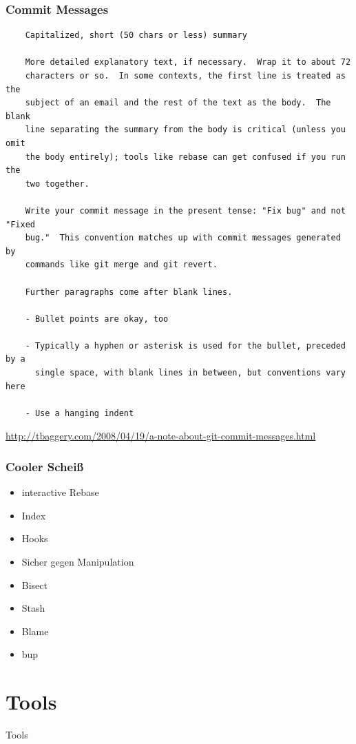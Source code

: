 \documentclass[]{beamer}
\begin{document}
\begin{frame}[fragile]
	\frametitle{Commit Messages}
	\fontsize{8}{8}\selectfont
	\begin{verbatim}
	Capitalized, short (50 chars or less) summary

	More detailed explanatory text, if necessary.  Wrap it to about 72
	characters or so.  In some contexts, the first line is treated as the
	subject of an email and the rest of the text as the body.  The blank
	line separating the summary from the body is critical (unless you omit
	the body entirely); tools like rebase can get confused if you run the
	two together.

	Write your commit message in the present tense: "Fix bug" and not "Fixed
	bug."  This convention matches up with commit messages generated by
	commands like git merge and git revert.

	Further paragraphs come after blank lines.

	- Bullet points are okay, too

	- Typically a hyphen or asterisk is used for the bullet, preceded by a
	  single space, with blank lines in between, but conventions vary here

	- Use a hanging indent
	\end{verbatim}
	\url{http://tbaggery.com/2008/04/19/a-note-about-git-commit-messages.html}
\end{frame}

\begin{frame}
	\frametitle{Cooler Scheiß\texttrademark}
	\begin{itemize}
		\item
			interactive Rebase
		\item
			Index
		\item
			Hooks
		\item
			Sicher gegen Manipulation
		\item
			Bisect
		\item
			Stash
		\item
			Blame
		\item
			bup
	\end{itemize}
\end{frame}

\section{Tools}
\begin{frame}
	\fontsize{30}{10}\selectfont Tools
\end{frame}
\end{document}
